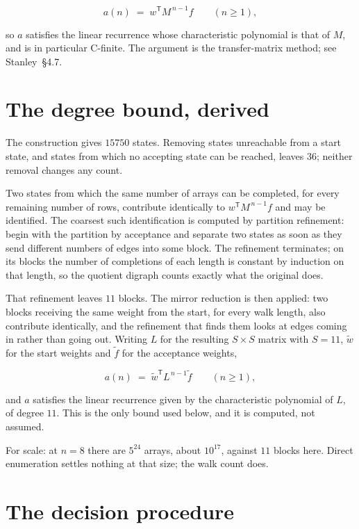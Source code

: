 \documentclass[11pt]{article}
\theoremstyle{definition}
\begin{document}
\[a(n) \;=\; w^{\mathsf T} M^{\,n-1} f \qquad (n \ge 1),\]

so $a$ satisfies the linear recurrence whose characteristic polynomial is that of $M$, and is in particular C-finite. The argument is the transfer-matrix method; see Stanley~\S4.7.

\section{The degree bound, derived}

The construction gives $15750$ states. Removing states unreachable from a start state, and states from which no accepting state can be reached, leaves $36$; neither removal changes any count.

Two states from which the same number of arrays can be completed, for every remaining number of rows, contribute identically to $w^{\mathsf T}M^{\,n-1}f$ and may be identified. The coarsest such identification is computed by partition refinement: begin with the partition by acceptance and separate two states as soon as they send different numbers of edges into some block. The refinement terminates; on its blocks the number of completions of each length is constant by induction on that length, so the quotient digraph counts exactly what the original does.

That refinement leaves $11$ blocks. The mirror reduction is then applied: two blocks receiving the same weight from the start, for every walk length, also contribute identically, and the refinement that finds them looks at edges coming in rather than going out. Writing $L$ for the resulting $S \times S$ matrix with $S = 11$, $\tilde w$ for the start weights and $\tilde f$ for the acceptance weights,

\[a(n) \;=\; \tilde w^{\mathsf T} L^{\,n-1} \tilde f \qquad (n \ge 1),\]

and $a$ satisfies the linear recurrence given by the characteristic polynomial of $L$, of degree $11$. This is the only bound used below, and it is computed, not assumed.

For scale: at $n = 8$ there are $5^{24}$ arrays, about $10^{17}$, against $11$ blocks here. Direct enumeration settles nothing at that size; the walk count does.

\section{The decision procedure}
\end{document}
